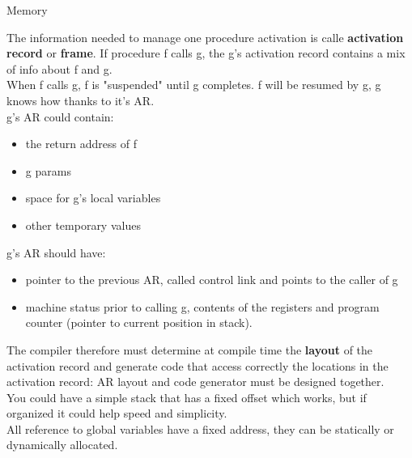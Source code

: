 \documentclass[12pt]{article}
\begin{document}
Memory \\

The information needed to manage one procedure activation is calle \textbf{activation record} or \textbf{frame}. If procedure f calls g, the g's activation record contains a mix of info about f and g.
\\ When f calls g, f is "suspended" until g completes. f will be resumed by g, g knows how thanks to it's AR.
\\ g's AR could contain:
\begin{itemize}
    \item the return address of f
    \item g params
    \item space for g's local variables
    \item other temporary values
\end{itemize}
g's AR should have: 
\begin{itemize}
    \item pointer to the previous AR, called control link and points to the caller of g
    \item machine status prior to calling g, contents of the registers and program counter (pointer to current position in stack).
\end{itemize}
The compiler therefore must determine at compile time the \textbf{layout} of the activation record and generate code that access correctly the locations in the activation record: AR layout and code generator must be designed together.
\\ You could have a simple stack that has a fixed offset which works, but if organized it could help speed and simplicity.
\\ All reference to global variables have a fixed address, they can be statically or dynamically allocated.
\\
\end{document}
